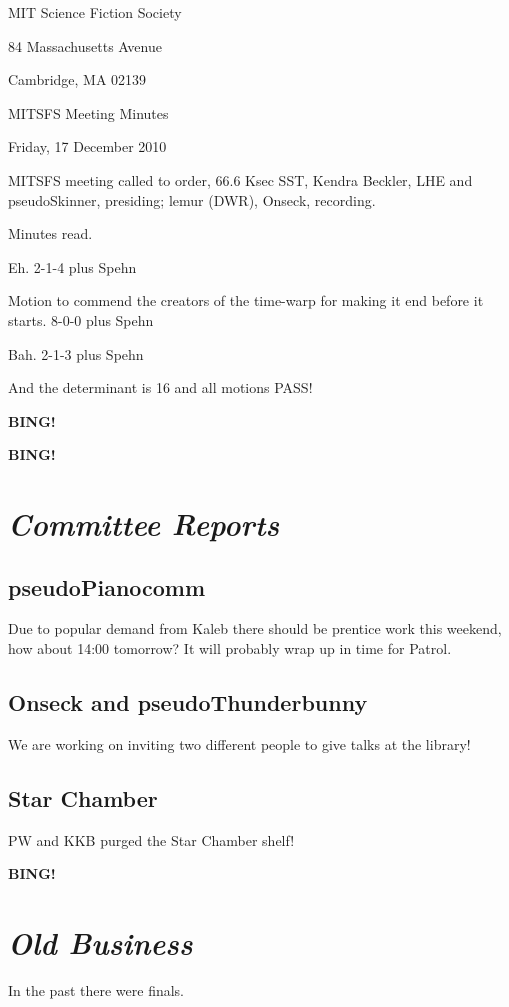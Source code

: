 \documentclass[10pt]{article}
\newcommand{\bing}{{\bf BING!} }
\newcommand{\goto}[1]{\bing \vskip 12pt \section*{{\em{#1}}}}
\newcommand{\ps}{ plus Spehn\xspace}
\newcommand{\skinner}{Kendra Beckler, LHE and pseudoSkinner}
\newcommand{\onseck}{lemur (DWR), Onseck}
\newcommand{\meetingdate}{Friday, 17 December 2010}
\begin{document}
\begin{center}

MIT Science Fiction Society

84 Massachusetts Avenue

Cambridge, MA 02139

\vspace{12pt}

MITSFS Meeting Minutes

\meetingdate

\end{center}

\vspace{18pt}

\setlength{\parskip}{6pt}

\noindent
MITSFS meeting called to order, 66.6 Ksec SST,
\skinner, presiding; \onseck, recording.

Minutes read.

Eh. 2-1-4\ps

Motion to commend the creators of the time-warp for making it end
before it starts. 8-0-0\ps

Bah. 2-1-3\ps

And the determinant is 16 and all motions PASS!

\bing

\goto{Committee Reports}

\subsection*{pseudoPianocomm}

Due to popular demand from Kaleb there should be prentice work this weekend,
how about 14:00 tomorrow?  It will probably wrap up in time for Patrol.

\subsection*{Onseck and pseudoThunderbunny}

We are working on inviting two different people to give talks at the 
library!

\subsection*{Star Chamber}

PW and KKB purged the Star Chamber shelf!

\goto{Old Business}

In the past there were finals.
\end{document}
